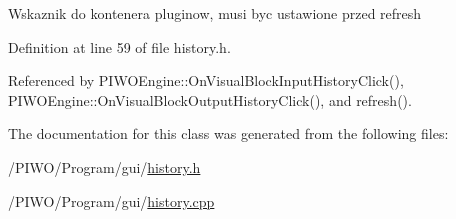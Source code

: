 Wskaznik do kontenera pluginow, musi byc ustawione przed refresh 

Definition at line 59 of file history.h.

Referenced by PIWOEngine::OnVisualBlockInputHistoryClick(), PIWOEngine::OnVisualBlockOutputHistoryClick(), and refresh().

The documentation for this class was generated from the following files:\begin{CompactItemize}
\item 
/PIWO/Program/gui/\hyperlink{history_8h}{history.h}\item 
/PIWO/Program/gui/\hyperlink{history_8cpp}{history.cpp}\end{CompactItemize}
